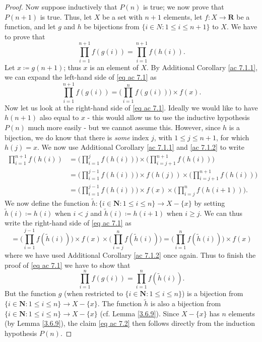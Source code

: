 \begin{proof}
    Now suppose inductively that \(P(n)\) is true;
    we now prove that \(P(n + 1)\) is true.
    Thus, let \(X\) be a set with \(n + 1\) elements, let \(f : X \to \mathbf{R}\) be a function, and let \(g\) and \(h\) be bijections from \(\{i \in N : 1 \leq i \leq n + 1\}\) to \(X\).
    We have to prove that
    \[
        \prod_{i = 1}^{n + 1} f(g(i)) = \prod_{i = 1}^{n + 1} f(h(i)). \tag{ac 7.1}\label{eq ac 7.1}
    \]
    Let \(x \coloneqq g(n + 1)\);
    thus \(x\) is an element of \(X\).
    By Additional Corollary \ref{ac 7.1.1}, we can expand the left-hand side of \eqref{eq ac 7.1} as
    \[
        \prod_{i = 1}^{n + 1} f(g(i)) = \Bigg(\prod_{i = 1}^n f(g(i))\Bigg) \times f(x).
    \]
    Now let us look at the right-hand side of \eqref{eq ac 7.1}.
    Ideally we would like to have \(h(n + 1)\) also equal to \(x\)
    - this would allow us to use the inductive hypothesis \(P(n)\) much more easily
    - but we cannot assume this.
    However, since \(h\) is a bijection, we do know that there is \emph{some} index \(j\), with \(1 \leq j \leq n + 1\), for which \(h(j) = x\).
    We now use Additional Corollary \ref{ac 7.1.1} and \ref{ac 7.1.2} to write
    \begin{align*}
        \prod_{i = 1}^{n + 1} f(h(i)) & = \Bigg(\prod_{i = 1}^j f(h(i))\Bigg) \times \Bigg(\prod_{i = j + 1}^{n + 1} f(h(i))\Bigg)                      \\
                                      & = \Bigg(\prod_{i = 1}^{j - 1} f(h(i))\Bigg) \times f(h(j)) \times \Bigg(\prod_{i = j + 1}^{n + 1} f(h(i))\Bigg) \\
                                      & = \Bigg(\prod_{i = 1}^{j - 1} f(h(i))\Bigg) \times f(x) \times \Bigg(\prod_{i = j}^n f(h(i + 1))\Bigg).
    \end{align*}
    We now define the function \(\tilde{h} : \{i \in \mathbf{N} : 1 \leq i \leq n\} \to X - \{x\}\) by setting \(\tilde{h}(i) \coloneqq h(i)\) when \(i < j\) and \(\tilde{h}(i) \coloneqq h(i + 1)\) when \(i \geq j\).
    We can thus write the right-hand side of \eqref{eq ac 7.1} as
    \[
        = \Bigg(\prod_{i = 1}^{j - 1} f(\tilde{h}(i))\Bigg) \times f(x) \times \Bigg(\prod_{i = j}^n f(\tilde{h}(i))\Bigg) = \Bigg(\prod_{i = 1}^n f(\tilde{h}(i))\Bigg) \times f(x)
    \]
    where we have used Additional Corollary \ref{ac 7.1.2} once again.
    Thus to finish the proof of \eqref{eq ac 7.1} we have to show that
    \[
        \prod_{i = 1}^n f(g(i)) = \prod_{i = 1}^n f(\tilde{h}(i)). \tag{ac 7.2}\label{eq ac 7.2}
    \]
    But the function \(g\) (when restricted to \(\{i \in \mathbf{N} : 1 \leq i \leq n\}\)) is a bijection from \(\{i \in \mathbf{N} : 1 \leq i \leq n\} \to X - \{x\}\).
    The function \(\tilde{h}\) is also a bijection from \(\{i \in \mathbf{N} : 1 \leq i \leq n\} \to X - \{x\}\) (cf. Lemma \ref{3.6.9}).
    Since \(X - \{x\}\) has \(n\) elements (by Lemma \ref{3.6.9}), the claim \eqref{eq ac 7.2} then follows directly from the induction hypothesis \(P(n)\).
\end{proof}


